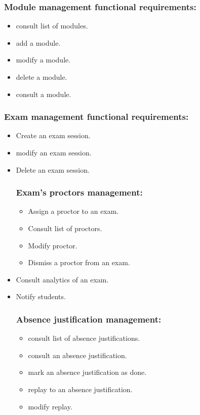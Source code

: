 \documentclass[]{uc2pfecaneva}
\begin{document}
\begin{itemize}
\begin{itemize}
        \end{itemize}

        \subsubsection{Module management functional requirements:}
        \begin{itemize}
            \item consult list of modules.
            \item add a module.
            \item modify a module.
            \item delete a module.
            \item consult a module.
        \end{itemize}

        \subsubsection{Exam management functional requirements:}
        \begin{itemize}
            \item Create an exam session.
            \item modify an exam session.
            \item Delete an exam session.
            \subsubsection{Exam's proctors management:}
            \begin{itemize}
                \item Assign a proctor to an exam.
                \item Consult list of proctors.
                \item Modify proctor.
                \item Dismiss a proctor from an exam.
            \end{itemize}
            \item Consult analytics of an exam.
            \item Notify students.
            \subsubsection{Absence justification management:}
            \begin{itemize}
                \item consult list of absence justifications.
                \item consult an absence justification.
                \item mark an absence justification as done.
                \item replay to an absence justification.
                \item modify replay.
            \end{itemize}
        \end{itemize}


\end{itemize}
\end{document}
